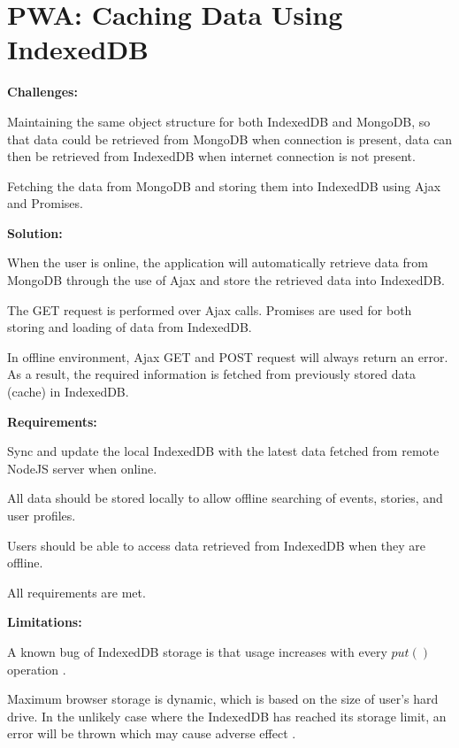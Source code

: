 \documentclass[11pt, a4paper]{article}
\begin{document}
\section{PWA: Caching Data Using IndexedDB}
\textbf{Challenges:}
\begin{enumerate*}[label=\textbf{\arabic*})]
\item Maintaining the same object structure for both IndexedDB and MongoDB, so that data could be
retrieved from MongoDB when connection is present, data can then be retrieved from IndexedDB when
internet connection is not present.
\item Fetching the data from MongoDB and storing them into IndexedDB using Ajax and Promises.
\end{enumerate*}
%
\textbf{Solution:}
\begin{enumerate*}[label=\textbf{\arabic*})]
\item When the user is online, the application will automatically retrieve data from MongoDB through
the use of Ajax and store the retrieved data into IndexedDB.
\item The GET request is performed over Ajax calls. Promises are used for both storing and loading
of data from IndexedDB.
\item In offline environment, Ajax GET and POST request will always return an error. As a result,
the required information is fetched from previously stored data (cache) in IndexedDB.
\end{enumerate*}
%
\textbf{Requirements:}
\begin{enumerate*}[label=\textbf{\arabic*})]
\item Sync and update the local IndexedDB with the latest data fetched from remote NodeJS server
when online.
\item All data should be stored locally to allow offline searching of events, stories, and user
profiles.
\item Users should be able to access data retrieved from IndexedDB when they are offline.
\item All requirements are met.
\end{enumerate*}
%
\textbf{Limitations:}
\begin{enumerate*}[label=\textbf{\arabic*})]
\item A known bug of IndexedDB storage is that usage increases with every $put()$ operation
\cite{leveldb_593, leveldb_603}.
\item Maximum browser storage is dynamic, which is based on the size of user's hard drive. In
the unlikely case where the IndexedDB has reached its storage limit, an error will be thrown
which may cause adverse effect \cite{browser_storage_limit}.
\end{enumerate*}
\end{document}
